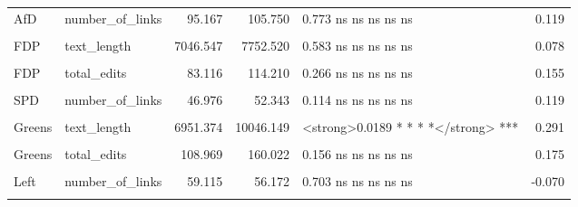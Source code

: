 \begin{table}
\begin{tabular}[t]{llrrlr}
\cmidrule{1-6}
AfD & number_of_links & 95.167 & 105.750 & 0.773 ns ns ns ns ns & 0.119\\
\cmidrule{1-6}
\cellcolor{gray!10}{AfD} & \cellcolor{gray!10}{total_edits} & \cellcolor{gray!10}{365.083} & \cellcolor{gray!10}{367.583} & \cellcolor{gray!10}{0.992 ns ns ns ns ns} & \cellcolor{gray!10}{0.004}\\
\cmidrule{1-6}
FDP & text_length & 7046.547 & 7752.520 & 0.583 ns ns ns ns ns & 0.078\\
\cmidrule{1-6}
\cellcolor{gray!10}{FDP} & \cellcolor{gray!10}{number_of_links} & \cellcolor{gray!10}{62.849} & \cellcolor{gray!10}{63.110} & \cellcolor{gray!10}{0.974 ns ns ns ns ns} & \cellcolor{gray!10}{0.005}\\
\cmidrule{1-6}
FDP & total_edits & 83.116 & 114.210 & 0.266 ns ns ns ns ns & 0.155\\
\cmidrule{1-6}
\cellcolor{gray!10}{SPD} & \cellcolor{gray!10}{text_length} & \cellcolor{gray!10}{5644.078} & \cellcolor{gray!10}{6842.022} & \cellcolor{gray!10}{<strong>0.0405 * * * *</strong> ***} & \cellcolor{gray!10}{0.153}\\
\cmidrule{1-6}
SPD & number_of_links & 46.976 & 52.343 & 0.114 ns ns ns ns ns & 0.119\\
\cmidrule{1-6}
\cellcolor{gray!10}{SPD} & \cellcolor{gray!10}{total_edits} & \cellcolor{gray!10}{80.928} & \cellcolor{gray!10}{102.463} & \cellcolor{gray!10}{0.114 ns ns ns ns ns} & \cellcolor{gray!10}{0.118}\\
\cmidrule{1-6}
Greens & text_length & 6951.374 & 10046.149 & <strong>0.0189 * * * *</strong> *** & 0.291\\
\cmidrule{1-6}
\cellcolor{gray!10}{Greens} & \cellcolor{gray!10}{number_of_links} & \cellcolor{gray!10}{54.675} & \cellcolor{gray!10}{68.657} & \cellcolor{gray!10}{<strong>0.0319 * * * *</strong> ***} & \cellcolor{gray!10}{0.257}\\
\cmidrule{1-6}
Greens & total_edits & 108.969 & 160.022 & 0.156 ns ns ns ns ns & 0.175\\
\cmidrule{1-6}
\cellcolor{gray!10}{Left} & \cellcolor{gray!10}{text_length} & \cellcolor{gray!10}{8771.016} & \cellcolor{gray!10}{8564.017} & \cellcolor{gray!10}{0.902 ns ns ns ns ns} & \cellcolor{gray!10}{-0.022}\\
\cmidrule{1-6}
Left & number_of_links & 59.115 & 56.172 & 0.703 ns ns ns ns ns & -0.070\\
\cmidrule{1-6}
\cellcolor{gray!10}{Left} & \cellcolor{gray!10}{total_edits} & \cellcolor{gray!10}{165.672} & \cellcolor{gray!10}{136.741} & \cellcolor{gray!10}{0.469 ns ns ns ns ns} & \cellcolor{gray!10}{-0.131}\\
\bottomrule
\end{tabular}
\end{table}
